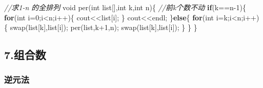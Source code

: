 \documentclass[
]{article}
\newenvironment{Shaded}{}{}
\newcommand{\CommentTok}[1]{\textcolor[rgb]{0.38,0.63,0.69}{\textit{#1}}}
\newcommand{\ControlFlowTok}[1]{\textcolor[rgb]{0.00,0.44,0.13}{\textbf{#1}}}
\newcommand{\DataTypeTok}[1]{\textcolor[rgb]{0.56,0.13,0.00}{#1}}
\newcommand{\DecValTok}[1]{\textcolor[rgb]{0.25,0.63,0.44}{#1}}
\newcommand{\NormalTok}[1]{#1}
\newcommand{\OperatorTok}[1]{\textcolor[rgb]{0.40,0.40,0.40}{#1}}
\begin{document}
\begin{Shaded}
\begin{Highlighting}[]
\CommentTok{//求1{-}n 的全排列 }
\DataTypeTok{void}\NormalTok{ per}\OperatorTok{(}\DataTypeTok{int}\NormalTok{ list}\OperatorTok{[],}\DataTypeTok{int}\NormalTok{ k}\OperatorTok{,}\DataTypeTok{int}\NormalTok{ n}\OperatorTok{)\{}  \CommentTok{//前k个数不动 }
	\ControlFlowTok{if}\OperatorTok{(}\NormalTok{k}\OperatorTok{==}\NormalTok{n}\OperatorTok{{-}}\DecValTok{1}\OperatorTok{)\{}
		\ControlFlowTok{for}\OperatorTok{(}\DataTypeTok{int}\NormalTok{ i}\OperatorTok{=}\DecValTok{0}\OperatorTok{;}\NormalTok{i}\OperatorTok{\textless{}}\NormalTok{n}\OperatorTok{;}\NormalTok{i}\OperatorTok{++)\{}
\NormalTok{			cout}\OperatorTok{\textless{}\textless{}}\NormalTok{list}\OperatorTok{[}\NormalTok{i}\OperatorTok{];} 
		\OperatorTok{\}}
\NormalTok{		cout}\OperatorTok{\textless{}\textless{}}\NormalTok{endl}\OperatorTok{;}
	\OperatorTok{\}}\ControlFlowTok{else}\OperatorTok{\{}
		\ControlFlowTok{for}\OperatorTok{(}\DataTypeTok{int}\NormalTok{ i}\OperatorTok{=}\NormalTok{k}\OperatorTok{;}\NormalTok{i}\OperatorTok{\textless{}}\NormalTok{n}\OperatorTok{;}\NormalTok{i}\OperatorTok{++)\{}
\NormalTok{			swap}\OperatorTok{(}\NormalTok{list}\OperatorTok{[}\NormalTok{k}\OperatorTok{],}\NormalTok{list}\OperatorTok{[}\NormalTok{i}\OperatorTok{]);}
\NormalTok{			per}\OperatorTok{(}\NormalTok{list}\OperatorTok{,}\NormalTok{k}\OperatorTok{+}\DecValTok{1}\OperatorTok{,}\NormalTok{n}\OperatorTok{);}
\NormalTok{			swap}\OperatorTok{(}\NormalTok{list}\OperatorTok{[}\NormalTok{k}\OperatorTok{],}\NormalTok{list}\OperatorTok{[}\NormalTok{i}\OperatorTok{]);} 
		\OperatorTok{\}}
	\OperatorTok{\}}
\OperatorTok{\}} 
\end{Highlighting}
\end{Shaded}

\hypertarget{7ux7ec4ux5408ux6570}{%
\subsection{7.组合数}\label{7ux7ec4ux5408ux6570}}

\hypertarget{ux9006ux5143ux6cd5}{%
\subsubsection{逆元法}\label{ux9006ux5143ux6cd5}}
\end{document}
